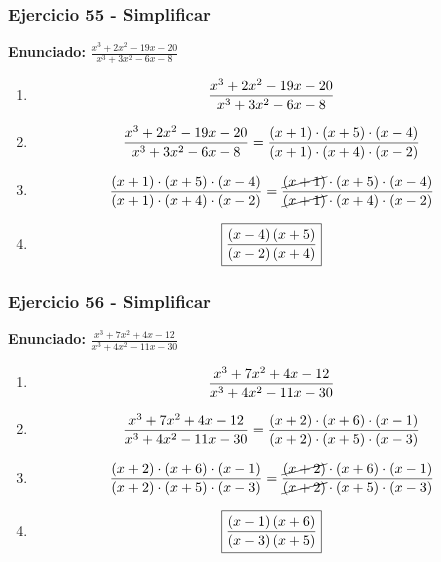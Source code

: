 \documentclass[11pt,a4paper]{article}
\newcommand{\fitmath}[1]{%
\[
\setbox0=\hbox{$\displaystyle #1$}%
\ifdim\wd0>\linewidth
\resizebox{\linewidth}{!}{$\displaystyle #1$}%
\else
#1%
\fi
\]
}
\begin{document}
\vspace{0.12cm}
\subsubsection*{Ejercicio 55 - Simplificar}
\textbf{Enunciado:} $ \frac{x^{3} + 2 x^{2} - 19 x - 20}{x^{3} + 3 x^{2} - 6 x - 8} $\par
\begin{enumerate}[leftmargin=2em]
\item \fitmath{\frac{x^{3} + 2 x^{2} - 19 x - 20}{x^{3} + 3 x^{2} - 6 x - 8}}
\item \fitmath{\frac{x^{3} + 2 x^{2} - 19 x - 20}{x^{3} + 3 x^{2} - 6 x - 8}=\frac{\left(x + 1\right)\cdot \left(x + 5\right)\cdot \left(x - 4\right)}{\left(x + 1\right)\cdot \left(x + 4\right)\cdot \left(x - 2\right)}}
\item \fitmath{\frac{\left(x + 1\right)\cdot \left(x + 5\right)\cdot \left(x - 4\right)}{\left(x + 1\right)\cdot \left(x + 4\right)\cdot \left(x - 2\right)}=\frac{\cancel{\left(x + 1\right)}\cdot \left(x + 5\right)\cdot \left(x - 4\right)}{\cancel{\left(x + 1\right)}\cdot \left(x + 4\right)\cdot \left(x - 2\right)}}
\item \fitmath{\boxed{\frac{\left(x - 4\right) \left(x + 5\right)}{\left(x - 2\right) \left(x + 4\right)}}}
\end{enumerate}

\vspace{0.12cm}
\subsubsection*{Ejercicio 56 - Simplificar}
\textbf{Enunciado:} $ \frac{x^{3} + 7 x^{2} + 4 x - 12}{x^{3} + 4 x^{2} - 11 x - 30} $\par
\begin{enumerate}[leftmargin=2em]
\item \fitmath{\frac{x^{3} + 7 x^{2} + 4 x - 12}{x^{3} + 4 x^{2} - 11 x - 30}}
\item \fitmath{\frac{x^{3} + 7 x^{2} + 4 x - 12}{x^{3} + 4 x^{2} - 11 x - 30}=\frac{\left(x + 2\right)\cdot \left(x + 6\right)\cdot \left(x - 1\right)}{\left(x + 2\right)\cdot \left(x + 5\right)\cdot \left(x - 3\right)}}
\item \fitmath{\frac{\left(x + 2\right)\cdot \left(x + 6\right)\cdot \left(x - 1\right)}{\left(x + 2\right)\cdot \left(x + 5\right)\cdot \left(x - 3\right)}=\frac{\cancel{\left(x + 2\right)}\cdot \left(x + 6\right)\cdot \left(x - 1\right)}{\cancel{\left(x + 2\right)}\cdot \left(x + 5\right)\cdot \left(x - 3\right)}}
\item \fitmath{\boxed{\frac{\left(x - 1\right) \left(x + 6\right)}{\left(x - 3\right) \left(x + 5\right)}}}
\end{enumerate}
\end{document}
